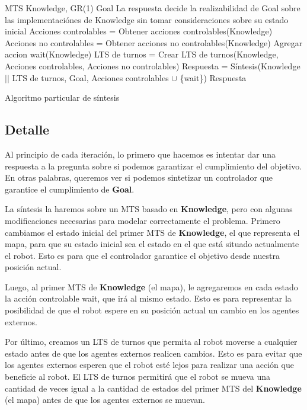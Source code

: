 \begin{algorithm}
\begin{algorithmic}
\REQUIRE MTS Knowledge, GR(1) Goal
\ENSURE La respuesta decide la realizabilidad de Goal sobre las implementaciónes de Knowledge sin tomar consideraciones sobre su estado inicial
\STATE Acciones controlables = Obtener acciones controlables(Knowledge)
\STATE Acciones no controlables = Obtener acciones no controlables(Knowledge)
\STATE Agregar accion wait(Knowledge)
\STATE LTS de turnos = Crear LTS de turnos(Knowledge, Acciones controlables, Acciones no controlables)
\STATE Respuesta = Síntesis(Knowledge $||$ LTS de turnos, Goal, Acciones controlables $\cup$ \{wait\})
\RETURN Respuesta
\end{algorithmic}
\caption{Algoritmo particular de síntesis}
\end{algorithm}

\subsection{Detalle}

Al principio de cada iteración, lo primero que hacemos es intentar dar una respuesta a la pregunta sobre si podemos garantizar el cumplimiento del objetivo. 
En otras palabras, queremos ver si podemos sintetizar un controlador que garantice el cumplimiento de \textbf{Goal}.

La síntesis la haremos sobre un MTS basado en \textbf{Knowledge}, pero con algunas modificaciones necesarias para modelar correctamente el problema. 
Primero cambiamos el estado inicial del primer MTS de \textbf{Knowledge}, el que representa el mapa, para que su estado inicial sea el estado en el que está 
situado actualmente el robot. Esto es para que el controlador garantice el objetivo desde nuestra posición actual.

Luego, al primer MTS de \textbf{Knowledge} (el mapa), le agregaremos en cada estado la acción controlable wait, que irá al mismo estado. 
Esto es para representar la posibilidad de que el robot espere en su posición actual un cambio en los agentes externos.

Por último, creamos un LTS de turnos que permita al robot moverse a cualquier estado antes de que los agentes externos realicen cambios. Esto es para evitar que los 
agentes externos esperen que el robot esté lejos para realizar una acción que beneficie al robot. El LTS de turnos permitirá que el robot se mueva una cantidad 
de veces igual a la cantidad de estados del primer MTS del \textbf{Knowledge} (el mapa) antes de que los agentes externos se muevan.

